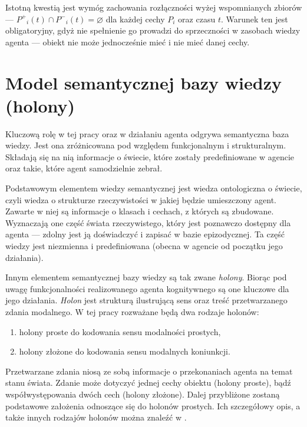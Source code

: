 Istotną kwestią jest wymóg zachowania rozłączności wyżej wspomnianych zbiorów --- 
$ P^+{}_i(t) \cap P^-{}_i(t) = \varnothing $
dla każdej cechy $ P_i $ oraz czasu $ t $. Warunek ten jest obligatoryjny, gdyż nie spełnienie go prowadzi do sprzeczności w zasobach wiedzy agenta --- obiekt nie może jednocześnie mieć i nie mieć danej cechy.


\section{Model semantycznej bazy wiedzy (holony)}

Kluczową rolę w tej pracy oraz w działaniu agenta odgrywa semantyczna baza wiedzy. Jest ona zróżnicowana pod względem funkcjonalnym i strukturalnym. Składają się na nią informacje o świecie, które zostały predefiniowane w agencie oraz takie, które agent samodzielnie zebrał.

Podstawowym elementem wiedzy semantycznej jest wiedza ontologiczna o świecie, czyli wiedza o strukturze rzeczywistości w jakiej będzie umieszczony agent. Zawarte w niej są informacje o klasach i cechach, z których są zbudowane. Wyznaczają one część świata rzeczywistego, który jest poznawczo dostępny dla agenta --- zdolny jest ją doświadczyć i zapisać w bazie epizodycznej. Ta część wiedzy jest niezmienna i predefiniowana (obecna w agencie od początku jego działania).

Innym elementem semantycznej bazy wiedzy są tak zwane \textit{holony}. Biorąc pod uwagę funkcjonalności realizowanego agenta kognitywnego są one kluczowe dla jego działania. \textit{Holon} jest strukturą ilustrującą sens oraz treść przetwarzanego zdania modalnego. W tej pracy rozważane będą dwa rodzaje holonów: 

\begin{enumerate}
	\setlength{\itemindent}{.5in}
	\item holony proste do kodowania sensu modalności prostych,
	\item holony złożone do kodowania sensu modalnych koniunkcji.
\end{enumerate}

Przetwarzane zdania niosą ze sobą informacje o przekonaniach agenta na temat stanu świata. Zdanie może dotyczyć jednej cechy obiektu (holony proste), bądź współwystępowania dwóch cech (holony złożone). Dalej przybliżone zostaną podstawowe założenia odnoszące się do holonów prostych. Ich szczegółowy opis, a także innych rodzajów holonów można znaleźć w \cite{raport}.

